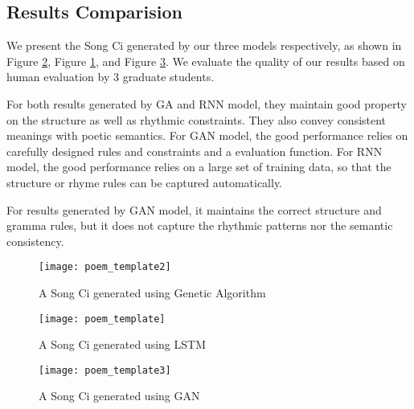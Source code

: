\subsection {Results Comparision}
We present  the Song Ci generated by our three models respectively, as shown in Figure \ref{fig:poem_template}, Figure \ref{fig:poem_template2}, and Figure \ref{fig:poem_template3}. We evaluate the quality of our results based on human evaluation by 3 graduate students.

For both results generated by GA and RNN model, they maintain good property on the structure as well as rhythmic constraints. %
They also convey consistent meanings with poetic semantics. For GAN model, the good performance relies on carefully designed rules and constraints and a evaluation function. 
%
For RNN model, the good performance relies on a large set of training data, so that the structure or rhyme rules can be captured automatically.

For results generated by GAN model, it maintains the correct structure and gramma rules, but it does not capture the rhythmic patterns nor the semantic consistency.

\begin{figure}[htbp]
	\centering
	\texttt{[image: poem\_template2]}
	\caption{A Song Ci generated using Genetic Algorithm }
	\label{fig:poem_template2}
\end{figure}

\begin{figure}[htbp]
	\centering
	\texttt{[image: poem\_template]}
	\caption{A Song Ci generated using LSTM}
	\label{fig:poem_template}
\end{figure}


\begin{figure}[htbp]
	\centering
	\texttt{[image: poem\_template3]}
	\caption{A Song Ci generated using GAN }
	\label{fig:poem_template3}
\end{figure}